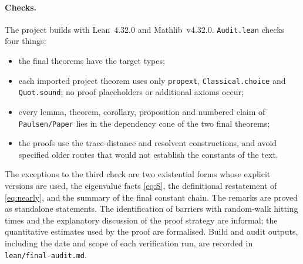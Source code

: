 \paragraph{Checks.} The project builds with Lean~4.32.0 and Mathlib~v4.32.0.
\texttt{Audit.lean} checks four things:
\begin{itemize}
\item the final theorems have the target types;
\item each imported project theorem uses only \texttt{propext},
\texttt{Classical.choice} and \texttt{Quot.sound}; no proof placeholders or
additional axioms occur;
\item every lemma, theorem, corollary, proposition and numbered claim of
\texttt{Paulsen/Paper} lies in the dependency cone of the two final theorems;
\item the proofs use the trace-distance and resolvent constructions, and avoid
specified older routes that would not establish the constants of the text.
\end{itemize}
The exceptions to the third check are two existential forms whose explicit
versions are used, the eigenvalue facts \eqref{eq:S}, the definitional
restatement of \eqref{eq:nearly}, and the summary of the final constant chain. The remarks are proved as standalone
statements. The identification of barriers with random-walk hitting times and
the explanatory discussion of the proof strategy are informal; the quantitative
estimates used by the proof are formalised. Build and audit outputs, including
the date and scope of each verification run, are recorded in
\texttt{lean/final-audit.md}.
